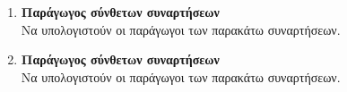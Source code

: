 \documentclass[twoside,nofonts,internet]{askhseis}
\begin{document}
\begin{enumerate}
\item \textbf{Παράγωγος σύνθετων συναρτήσεων}\\
Να υπολογιστούν οι παράγωγοι των παρακάτω συναρτήσεων.
\begin{multicols}{2}
\end{multicols}
\item \textbf{Παράγωγος σύνθετων συναρτήσεων}\\
Να υπολογιστούν οι παράγωγοι των παρακάτω συναρτήσεων.
\begin{multicols}{2}
\end{multicols}
\end{enumerate}
\end{document}
